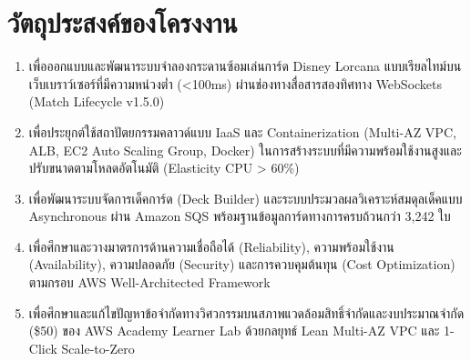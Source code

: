 \documentclass[12pt,a4paper]{report}
\begin{document}
\section{วัตถุประสงค์ของโครงงาน}
\begin{enumerate}
    \item เพื่อออกแบบและพัฒนาระบบจำลองกระดานซ้อมเล่นการ์ด Disney Lorcana แบบเรียลไทม์บนเว็บเบราว์เซอร์ที่มีความหน่วงต่ำ (<100ms) ผ่านช่องทางสื่อสารสองทิศทาง WebSockets (Match Lifecycle v1.5.0)
    \item เพื่อประยุกต์ใช้สถาปัตยกรรมคลาวด์แบบ IaaS และ Containerization (Multi-AZ VPC, ALB, EC2 Auto Scaling Group, Docker) ในการสร้างระบบที่มีความพร้อมใช้งานสูงและปรับขนาดตามโหลดอัตโนมัติ (Elasticity CPU > 60\%)
    \item เพื่อพัฒนาระบบจัดการเด็คการ์ด (Deck Builder) และระบบประมวลผลวิเคราะห์สมดุลเด็คแบบ Asynchronous ผ่าน Amazon SQS พร้อมฐานข้อมูลการ์ดทางการครบถ้วนกว่า 3,242 ใบ
    \item เพื่อศึกษาและวางมาตรการด้านความเชื่อถือได้ (Reliability), ความพร้อมใช้งาน (Availability), ความปลอดภัย (Security) และการควบคุมต้นทุน (Cost Optimization) ตามกรอบ AWS Well-Architected Framework
    \item เพื่อศึกษาและแก้ไขปัญหาข้อจำกัดทางวิศวกรรมบนสภาพแวดล้อมสิทธิ์จำกัดและงบประมาณจำกัด (\$50) ของ AWS Academy Learner Lab ด้วยกลยุทธ์ Lean Multi-AZ VPC และ 1-Click Scale-to-Zero
\end{enumerate}
\end{document}
